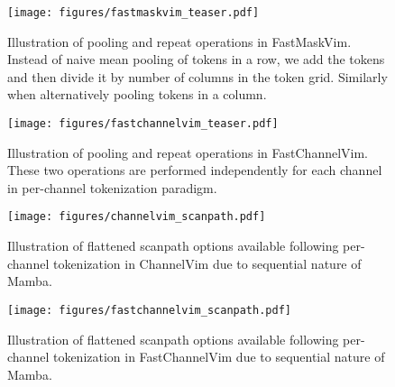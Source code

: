 \newpage

\begin{figure}[!h]
\centering
    \texttt{[image: figures/fastmaskvim\_teaser.pdf]} 
    \caption{Illustration of pooling and repeat operations in FastMaskVim. Instead of naive mean pooling of tokens in a row, we add the tokens and then divide it by number of columns in the token grid. Similarly when alternatively pooling tokens in a column.}
\label{fig:fastmaskvim_teaser}
\end{figure}


\begin{figure}[!h]
\centering
    \texttt{[image: figures/fastchannelvim\_teaser.pdf]} 
    \caption{Illustration of pooling and repeat operations in FastChannelVim. These two operations are performed independently for each channel in per-channel tokenization paradigm.}
\label{fig:fastchannelvim_teaser}
\end{figure}




\begin{figure}[!h]
\centering
    \texttt{[image: figures/channelvim\_scanpath.pdf]} 
    \caption{Illustration of flattened scanpath options available following per-channel tokenization in ChannelVim due to sequential nature of Mamba.}
\label{fig:channelvim_scanpath}
\end{figure}


\begin{figure}[!h]
\centering
    \texttt{[image: figures/fastchannelvim\_scanpath.pdf]} 
    \caption{Illustration of flattened scanpath options available following per-channel tokenization in FastChannelVim due to sequential nature of Mamba.}
\label{fig:fastchannelvim_scanpath}
\end{figure}




